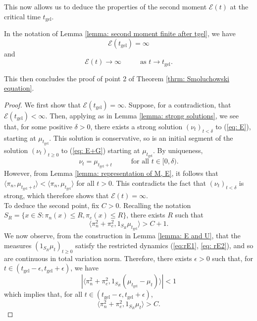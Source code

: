 This now allows us to deduce the properties of the second moment $\mathcal{E}(t)$ at the critical time $t_\mathrm{gel}$. \begin{lemma} In the notation of Lemma \ref{lemma: second moment finite after tgel}, we have \begin{equation} \mathcal{E}(t_\mathrm{gel})=\infty \end{equation} and \begin{equation} \mathcal{E}(t)\rightarrow \infty \hspace{1cm} \text{ as } t\rightarrow t_\mathrm{gel}. \end{equation}  \end{lemma} This then concludes the proof of point 2 of Theorem \ref{thrm: Smoluchowski equation}.
\begin{proof}We first show that $\mathcal{E}(t_\mathrm{gel})=\infty$. Suppose, for a contradiction, that $\mathcal{E}(t_\mathrm{gel})<\infty.$ Then, applying \cite[Proposition 2.7]{N00} as in Lemma \ref{lemma: strong solutions}, we see that, for some positive $\delta>0$, there exists a strong solution $(\nu_t)_{t<\delta}$ to (\ref{eq: E}), starting at $\mu_{t_\mathrm{gel}}.$ This solution is conservative, so is an initial segment of the solution $(\nu_t)_{t\ge 0}$ to (\ref{eq: E+G}) starting at $\mu_{ t_\mathrm{gel}}$. By uniqueness, \begin{equation}
    \nu_t=\mu_{t_\mathrm{gel}+t} \hspace{1cm} \text{ for all }t\in[0, \delta).
\end{equation} However, from Lemma \ref{lemma: representation of M, E}, it follows that $\langle \pi_n, \mu_{t_\mathrm{gel}+t}\rangle < \langle \pi_n, \mu_{t_\mathrm{gel}}\rangle$ for all $t>0$. This contradicts the fact that $(\nu_t)_{t<\delta}$ is strong, which therefore shows that $\mathcal{E}(t)=\infty$. \medskip \\ To deduce the second point, fix $C>0$. Recalling the notation $S_R=\{x\in S: \pi_n(x)\le R, \pi_e(x)\le R\}$, there exists $R$ such that \begin{equation} \langle \pi_n^2 +\pi_e^2, 1_{S_R}\mu_{t_\mathrm{gel}}\rangle >C+1. \end{equation} We now observe, from the construction in Lemma \ref{lemma: E and U}, that the measures $(1_{S_R}\mu_t)_{t\ge 0}$ satisfy the restricted dynamics (\ref{eq:rE1}, \ref{eq: rE2}), and so are continuous in total variation norm. Therefore, there exists $\epsilon>0$ such that, for $t \in (t_\mathrm{gel}-\epsilon, t_\mathrm{gel}+\epsilon)$, we have \begin{equation} |\langle \pi_n^2 +\pi_e^2, 1_{S_R}(\mu_{t_\mathrm{gel}}-\mu_t)\rangle|<1 \end{equation} which implies that, for all $t\in (t_\mathrm{gel}-\epsilon, t_\mathrm{gel}+\epsilon)$, \begin{equation} \langle \pi_n^2 +\pi_e^2, 1_{S_R}\mu_{t}\rangle >C. \end{equation}  \end{proof}

